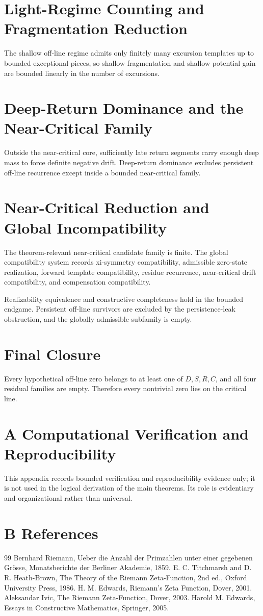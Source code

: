 \documentclass[11pt]{article}
\theoremstyle{definition}
\begin{document}
\section{Light-Regime Counting and Fragmentation Reduction}
The shallow off-line regime admits only finitely many excursion templates up to bounded exceptional pieces, so shallow fragmentation and shallow potential gain are bounded linearly in the number of excursions.
\section{Deep-Return Dominance and the Near-Critical Family}
Outside the near-critical core, sufficiently late return segments carry enough deep mass to force definite negative drift. Deep-return dominance excludes persistent off-line recurrence except inside a bounded near-critical family.
\section{Near-Critical Reduction and Global Incompatibility}
The theorem-relevant near-critical candidate family is finite. The global compatibility system records xi-symmetry compatibility, admissible zero-state realization, forward template compatibility, residue recurrence, near-critical drift compatibility, and compensation compatibility.

Realizability equivalence and constructive completeness hold in the bounded endgame. Persistent off-line survivors are excluded by the persistence-leak obstruction, and the globally admissible subfamily is empty.
\section{Final Closure}
Every hypothetical off-line zero belongs to at least one of $D,S,R,C$, and all four residual families are empty. Therefore every nontrivial zero lies on the critical line.

\section*{A Computational Verification and Reproducibility}
This appendix records bounded verification and reproducibility evidence only; it is not used in the logical derivation of the main theorems. Its role is evidentiary and organizational rather than universal.

\section*{B References}
\begin{thebibliography}{99}
 Bernhard Riemann, Ueber die Anzahl der Primzahlen unter einer gegebenen Grösse, Monatsberichte der Berliner Akademie, 1859.
 E. C. Titchmarsh and D. R. Heath-Brown, The Theory of the Riemann Zeta-Function, 2nd ed., Oxford University Press, 1986.
 H. M. Edwards, Riemann's Zeta Function, Dover, 2001.
 Aleksandar Ivic, The Riemann Zeta-Function, Dover, 2003.
 Harold M. Edwards, Essays in Constructive Mathematics, Springer, 2005.
\end{thebibliography}
\end{document}
